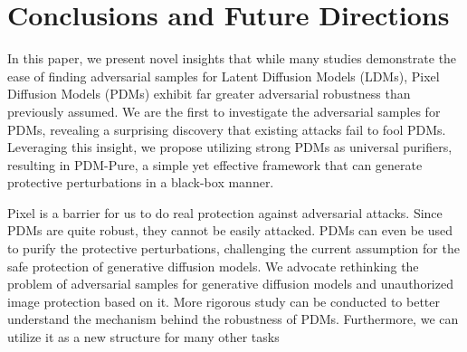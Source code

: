 \documentclass{article}
\begin{document}
\section{Conclusions and Future Directions}


In this paper, we present novel insights that while many studies demonstrate the ease of finding adversarial samples for Latent Diffusion Models (LDMs), Pixel Diffusion Models (PDMs) exhibit far greater adversarial robustness than previously assumed. We are the first to investigate the adversarial samples for PDMs, revealing a surprising discovery that existing attacks fail to fool PDMs. Leveraging this insight, we propose utilizing strong PDMs as universal purifiers, resulting in PDM-Pure, a simple yet effective framework that can generate protective perturbations in a black-box manner. 


Pixel is a barrier for us to do
real protection against adversarial attacks. Since PDMs are quite robust, they cannot be easily attacked.
PDMs can even be used to purify the protective perturbations, challenging the current assumption for
the safe protection of generative diffusion models. We advocate rethinking the problem of
adversarial samples for generative diffusion models and 
unauthorized image protection based on it. 
More rigorous study can be
conducted to better understand the mechanism behind the robustness of PDMs. Furthermore, we can utilize it as a new structure for many other tasks




{
\small


}

\newpage  
\tableofcontents



\end{document}
